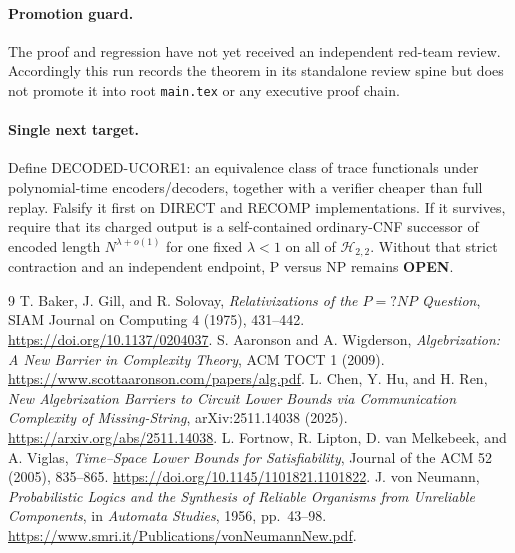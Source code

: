 \documentclass[11pt]{article}
\begin{document}
\paragraph{Promotion guard.}
The proof and regression have not yet received an independent red-team
review.  Accordingly this run records the theorem in its standalone review
spine but does not promote it into root \texttt{main.tex} or any executive
proof chain.

\paragraph{Single next target.}
Define \textsf{DECODED-UCORE1}: an equivalence class of trace functionals under
polynomial-time encoders/decoders, together with a verifier cheaper than full
replay.  Falsify it first on DIRECT and RECOMP implementations.  If it
survives, require that its charged output is a self-contained ordinary-CNF
successor of encoded length $N^{\lambda+o(1)}$ for one fixed $\lambda<1$ on
all of $\mathcal H_{2,2}$.  Without that strict contraction and an independent
endpoint, P versus NP remains \textbf{OPEN}.

\begin{thebibliography}{9}
 T. Baker, J. Gill, and R. Solovay,
\emph{Relativizations of the $P=?NP$ Question}, SIAM Journal on Computing 4
(1975), 431--442. \url{https://doi.org/10.1137/0204037}.
 S. Aaronson and A. Wigderson,
\emph{Algebrization: A New Barrier in Complexity Theory}, ACM TOCT 1 (2009).
\url{https://www.scottaaronson.com/papers/alg.pdf}.
 L. Chen, Y. Hu, and H. Ren,
\emph{New Algebrization Barriers to Circuit Lower Bounds via Communication
Complexity of Missing-String}, arXiv:2511.14038 (2025).
\url{https://arxiv.org/abs/2511.14038}.
 L. Fortnow, R. Lipton, D. van Melkebeek, and A. Viglas,
\emph{Time--Space Lower Bounds for Satisfiability}, Journal of the ACM 52
(2005), 835--865. \url{https://doi.org/10.1145/1101821.1101822}.
 J. von Neumann,
\emph{Probabilistic Logics and the Synthesis of Reliable Organisms from
Unreliable Components}, in \emph{Automata Studies}, 1956, pp.~43--98.
\url{https://www.smri.it/Publications/vonNeumannNew.pdf}.
\end{thebibliography}

\end{document}
